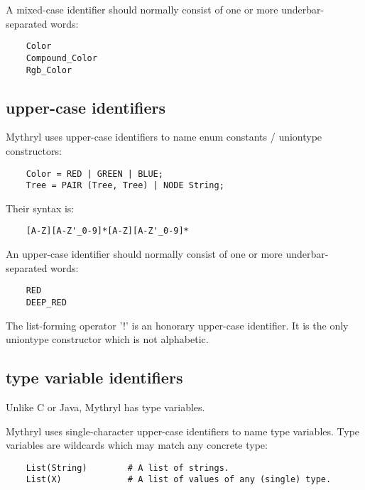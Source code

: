 A mixed-case identifier should normally consist of 
one or more underbar-separated words:

\begin{verbatim}
    Color
    Compound_Color
    Rgb_Color
\end{verbatim}

\cutend*

\subsection{upper-case identifiers}
\label{section:ref:identifiers:upper-case}

Mythryl uses upper-case identifiers to name 
enum constants / uniontype constructors:

\begin{verbatim}
    Color = RED | GREEN | BLUE;
    Tree = PAIR (Tree, Tree) | NODE String;
\end{verbatim}

Their syntax is:

\begin{verbatim}
    [A-Z][A-Z'_0-9]*[A-Z][A-Z'_0-9]*
\end{verbatim}

An upper-case identifier should normally consist of 
one or more underbar-separated words:

\begin{verbatim}
    RED
    DEEP_RED
\end{verbatim}

The list-forming operator '!' is an honorary upper-case identifier. 
It is the only uniontype constructor which is not alphabetic.

\cutend*

\subsection{type variable identifiers}
\label{section:ref:identifiers:type-variable}

Unlike C or Java, Mythryl has type variables.

Mythryl uses single-character upper-case identifiers to name 
type variables.  Type variables are wildcards which may 
match any concrete type:

\begin{verbatim}
    List(String)        # A list of strings.
    List(X)             # A list of values of any (single) type.
\end{verbatim}

